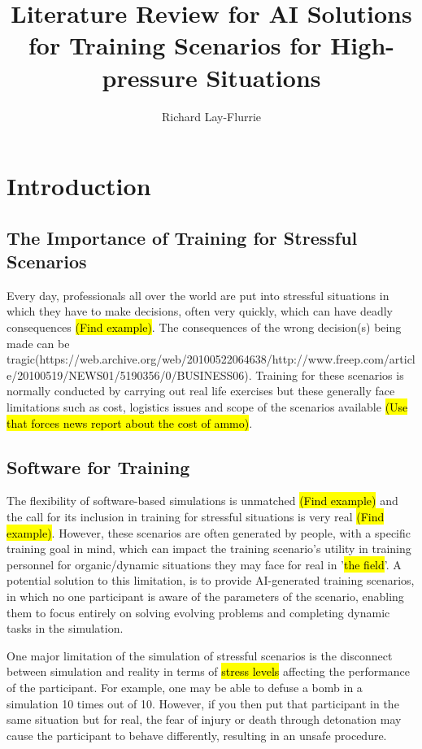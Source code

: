 \documentclass{article}
\title{Literature Review for AI Solutions for Training Scenarios for High-pressure Situations}
\author{Richard Lay-Flurrie}
\begin{document}
\maketitle

\tableofcontents


\section{Introduction}

\subsection{The Importance of Training for Stressful Scenarios}

Every day, professionals all over the world are put into stressful situations in which they have to make decisions, often very quickly, which can have deadly consequences \hl{(Find example)}. The consequences of the wrong decision(s) being made can be tragic(https://web.archive.org/web/20100522064638/http://www.freep.com/article/20100519/NEWS01/5190356/0/BUSINESS06). Training for these scenarios is normally conducted by carrying out real life exercises but these generally face limitations such as cost, logistics issues and scope of the scenarios available \hl{(Use that forces news report about the cost of ammo)}.

\subsection{Software for Training}

The flexibility of software-based simulations is unmatched \hl{(Find example)} and the call for its inclusion in training for stressful situations is very real \hl{(Find example)}. However, these scenarios are often generated by people, with a specific training goal in mind, which can impact the training scenario's utility in training personnel for organic/dynamic situations they may face for real in '\hl{the field}'. A potential solution to this limitation, is to provide AI-generated training scenarios, in which no one participant is aware of the parameters of the scenario, enabling them to focus entirely on solving evolving problems and completing dynamic tasks in the simulation.

One major limitation of the simulation of stressful scenarios is the disconnect between simulation and reality in terms of \hl{stress levels} affecting the performance of the participant. For example, one may be able to defuse a bomb in a simulation 10 times out of 10. However, if you then put that participant in the same situation but for real, the fear of injury or death through detonation may cause the participant to behave differently, resulting in an unsafe procedure.
\end{document}
